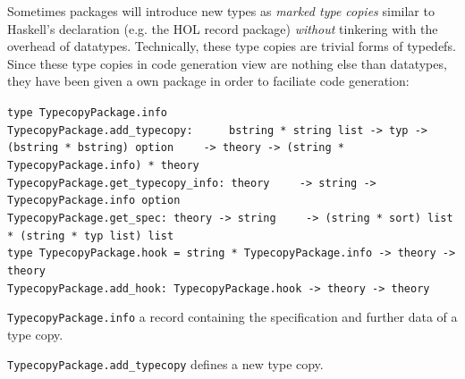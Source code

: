 \begin{isabellebody}
\begin{isamarkuptext}
\begin{description}
  \end{description}%
\end{isamarkuptext}%
\isamarkuptrue%
%
\endisatagmlref
{\isafoldmlref}%
%
\isadelimmlref
%
\endisadelimmlref
%
\isamarkuptrue%
%
\begin{isamarkuptext}%
Sometimes packages will introduce new types
  as \emph{marked type copies} similar to Haskell's
   declaration (e.g. the HOL record package)
  \emph{without} tinkering with the overhead of datatypes.
  Technically, these type copies are trivial forms of typedefs.
  Since these type copies in code generation view are nothing
  else than datatypes, they have been given a own package
  in order to faciliate code generation:%
\end{isamarkuptext}%
\isamarkuptrue%
%
\isadelimmlref
%
\endisadelimmlref
%
\isatagmlref
%
\begin{isamarkuptext}%
\begin{mldecls}
  \verb|type TypecopyPackage.info| \\
  \verb|TypecopyPackage.add_typecopy: |\isasep\isanewline%
\verb|    bstring * string list -> typ -> (bstring * bstring) option|\isasep\isanewline%
\verb|    -> theory -> (string * TypecopyPackage.info) * theory| \\
  \verb|TypecopyPackage.get_typecopy_info: theory|\isasep\isanewline%
\verb|    -> string -> TypecopyPackage.info option| \\
  \verb|TypecopyPackage.get_spec: theory -> string|\isasep\isanewline%
\verb|    -> (string * sort) list * (string * typ list) list| \\
  \verb|type TypecopyPackage.hook = string * TypecopyPackage.info -> theory -> theory| \\
  \verb|TypecopyPackage.add_hook: TypecopyPackage.hook -> theory -> theory| \\
  \end{mldecls}

  \begin{description}

  \item \verb|TypecopyPackage.info| a record containing
     the specification and further data of a type copy.

  \item \verb|TypecopyPackage.add_typecopy| defines a new
     type copy.


\end{description}
\end{isamarkuptext}
\end{isabellebody}
